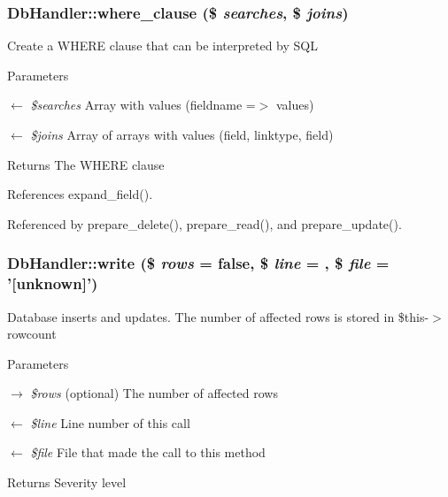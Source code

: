\subsubsection[{where\_\-clause}]{\setlength{\rightskip}{0pt plus 5cm}DbHandler::where\_\-clause (\$ {\em searches}, \/  \$ {\em joins})}\label{classDbHandler_a7715991ea990f6610a95844bebd75800}
Create a WHERE clause that can be interpreted by SQL


\begin{DoxyParams}{Parameters}
\item[\mbox{$\leftarrow$} {\em \$searches}]Array with values (fieldname =$>$ values) \item[\mbox{$\leftarrow$} {\em \$joins}]Array of arrays with values (field, linktype, field) \end{DoxyParams}
\begin{DoxyReturn}{Returns}
The WHERE clause 
\end{DoxyReturn}


References expand\_\-field().



Referenced by prepare\_\-delete(), prepare\_\-read(), and prepare\_\-update().

\subsubsection[{write}]{\setlength{\rightskip}{0pt plus 5cm}DbHandler::write (\$ {\em rows} = {\ttfamily false}, \/  \$ {\em line} = {}, \/  \$ {\em file} = {\ttfamily '\mbox{[}unknown\mbox{]}'})}\label{classDbHandler_a654166283f0f61f918cc34a5071f838c}
Database inserts and updates. The number of affected rows is stored in \$this-\/$>$rowcount


\begin{DoxyParams}{Parameters}
\item[\mbox{$\rightarrow$} {\em \$rows}](optional) The number of affected rows \item[\mbox{$\leftarrow$} {\em \$line}]Line number of this call \item[\mbox{$\leftarrow$} {\em \$file}]File that made the call to this method \end{DoxyParams}
\begin{DoxyReturn}{Returns}
Severity level 
\end{DoxyReturn}



